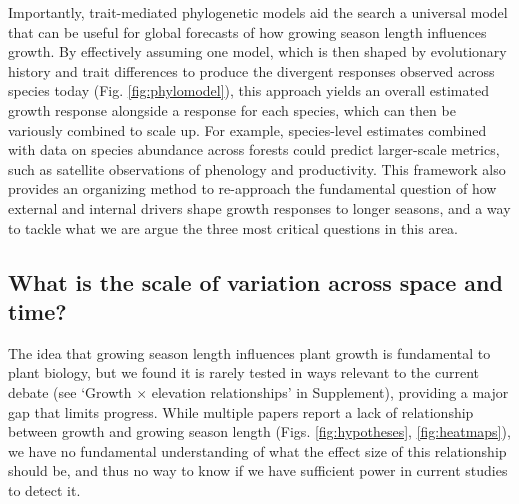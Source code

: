\documentclass[11pt]{article}
\begin{document}
Importantly, trait-mediated phylogenetic models aid the search a universal model that can be useful for global forecasts of how growing season length influences growth. By effectively assuming one model, which is then shaped by evolutionary history and trait differences to produce the divergent responses observed across species today (Fig. \ref{fig:phylomodel}), this approach yields an overall estimated growth response alongside a response for each species, which can then be variously combined to scale up. For example, species-level estimates combined with data on species abundance across forests \citep[e.g.][]{FIA,fischer2019swiss} could predict larger-scale metrics, such as satellite observations of phenology and productivity.
This framework also provides an organizing method to re-approach the fundamental question of how external and internal drivers shape growth responses to longer seasons, and a way to tackle what we are argue the three most critical questions in this area.


\subsection*{What is the scale of variation across space and time?} %

The idea that growing season length influences plant growth is fundamental to plant biology, but we found it is rarely tested in ways relevant to the current debate (see `Growth $\times$ elevation relationships' in Supplement), providing a major gap that limits progress. While multiple papers report a lack of relationship between growth and growing season length (Figs. \ref{fig:hypotheses}, \ref{fig:heatmaps}), we have no fundamental understanding of what the effect size of this relationship should be, and thus no way to know if we have sufficient power in current studies to detect it. %
\end{document}
